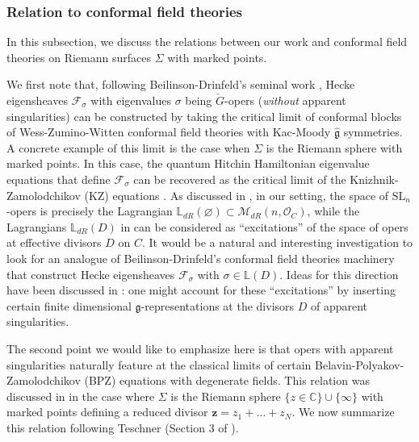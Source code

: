 \documentclass[twoside, 11pt]{article}
\numberwithin{equation}{section}
\theoremstyle{theorem}
\numberwithin{theorem}{section}
\theoremstyle{definition}
\begin{document}
\subsubsection{Relation to conformal field theories}
In this subsection, we discuss the relations between our work and conformal field theories on Riemann surfaces $\Sigma$ with marked points.


We first note that, following Beilinson-Drinfeld's seminal work \cite{BD92}, Hecke eigensheaves $\mathcal{F}_\sigma$ with eigenvalues $\sigma$ being $\check{G}$-opers (\textit{without} apparent singularities) can be constructed by taking the critical limit of conformal blocks of Wess-Zumino-Witten conformal field theories with Kac-Moody $\hat{\mathfrak{g}}$ symmetries. A concrete example of this limit is the case when $\Sigma$ is the Riemann sphere with marked points. In this case, the quantum Hitchin Hamiltonian eigenvalue equations that define $\mathcal{F}_\sigma$ can be recovered as the critical limit of the Knizhnik-Zamolodchikov (KZ) equations \cite{ReshetikhinVarchenko95, Teschner2011}. 
As discussed in , in our setting, the space of $\mathrm{SL}_n$-opers is precisely the Lagrangian $\mathbb{L}_{dR}(\varnothing) \subset \mathcal{M}_{dR}(n, \mathcal{O}_C)$, while the Lagrangians $\mathbb{L}_{dR}(D)$ in  can be considered as ``excitations'' of the space of opers at effective divisors $D$ on $C$.
It would be a natural and interesting investigation to look for an analogue of Beilinson-Drinfeld's conformal field theories machinery that construct Hecke eigensheaves $\mathcal{F}_\sigma$ with $\sigma \in \mathbb{L}(D)$. 
Ideas for this direction have been discussed in \cite{Frenkel2007, Ar16, GLC-proof}: one might account for these ``excitations'' by inserting certain finite dimensional $\mathfrak{g}$-representations at the divisors $D$ of apparent singularities.  

The second point we would like to emphasize here is that opers with apparent singularities naturally feature at the classical limits of certain Belavin-Polyakov-Zamolodchikov (BPZ) equations with degenerate fields.
This relation was discussed in \cite{Reshetikhin92, Teschner2011, Teschner17, Litvinov2014} in the case where $\Sigma$ is the Riemann sphere $\{z \in \mathbb{C} \}\cup \{\infty\}$ with marked points defining a reduced divisor $\mathbf{z} = z_1 + \dots + z_N$.
We now summarize this relation following Teschner (Section 3 of \cite{Teschner17}).
\end{document}
